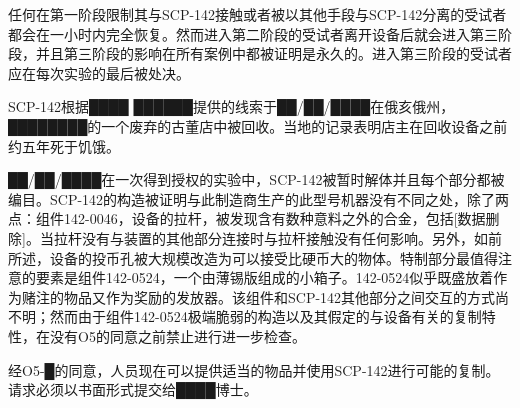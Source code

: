 任何在第一阶段限制其与SCP-142接触或者被以其他手段与SCP-142分离的受试者都会在一小时内完全恢复。然而进入第二阶段的受试者离开设备后就会进入第三阶段，并且第三阶段的影响在所有案例中都被证明是永久的。进入第三阶段的受试者应在每次实验的最后被处决。

SCP-142根据████ ██████提供的线索于██\slash ██\slash ████在俄亥俄州，████████的一个废弃的古董店中被回收。当地的记录表明店主在回收设备之前约五年死于饥饿。

██\slash ██\slash ████在一次得到授权的实验中，SCP-142被暂时解体并且每个部分都被编目。SCP-142的构造被证明与此制造商生产的此型号机器没有不同之处，除了两点：组件142-0046，设备的拉杆，被发现含有数种意料之外的合金，包括{[}数据删除]。当拉杆没有与装置的其他部分连接时与拉杆接触没有任何影响。另外，如前所述，设备的投币孔被大规模改造为可以接受比硬币大的物体。特制部分最值得注意的要素是组件142-0524，一个由薄锡版组成的小箱子。142-0524似乎既盛放着作为赌注的物品又作为奖励的发放器。该组件和SCP-142其他部分之间交互的方式尚不明；然而由于组件142-0524极端脆弱的构造以及其假定的与设备有关的复制特性，在没有O5的同意之前禁止进行进一步检查。

经O5-█的同意，人员现在可以提供适当的物品并使用SCP-142进行可能的复制。请求必须以书面形式提交给████博士。
